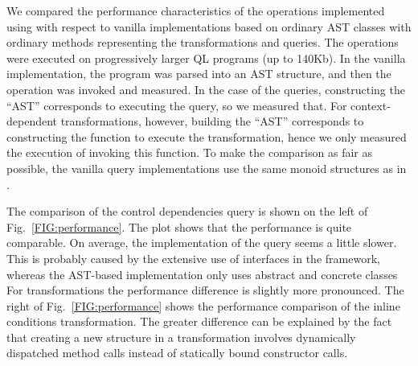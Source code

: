 We compared the performance characteristics of the operations implemented using \name with respect to vanilla implementations based on ordinary AST classes with ordinary methods representing the transformations and queries.
The operations were executed on progressively larger QL programs (up to 140Kb).
In the vanilla implementation, the program was parsed into an AST structure, and then the operation was invoked and measured.
In the case of the \name queries, constructing the ``AST'' corresponds to executing the query, so we measured that.
For context-dependent transformations, however, building the ``AST'' corresponds to constructing the function to execute the transformation, hence we only measured the execution of invoking this function.
To make the comparison as fair as possible, the vanilla query implementations use the same monoid structures as in \name.

The comparison of the control dependencies query is shown on the left of Fig.~\ref{FIG:performance}.
The plot shows that the performance is quite comparable.
On average, the \name implementation of the query seems a little slower.
This is probably caused by the extensive use of interfaces in the \name framework, whereas the AST-based implementation only uses abstract and concrete classes
For transformations the performance difference is slightly more pronounced.
The right of Fig.~\ref{FIG:performance} shows the performance comparison of the inline conditions transformation.
The greater difference can be explained by the fact that creating a new structure in a \name transformation involves dynamically dispatched method calls instead of statically bound constructor calls.




